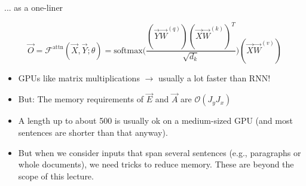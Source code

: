 
\begin{vbframe}{... as a one-liner}

\vfill

\large
$$ \vec O = \mathcal{F}^\mathrm{attn}(\vec X, \vec Y; \theta) = \mathrm{softmax}\Big(\frac{(\vec Y\vec W^{(q)} ) (\vec X\vec W^{(k)} )^T}{\sqrt{d_k}}\Big)(\vec X\vec W^{(v)} ) $$
\begin{itemize}
	\item GPUs like matrix multiplications $\rightarrow$ usually a lot faster than RNN!
	\item But: The memory requirements of $\vec E$ and $\vec A$ are $\mathcal{O}(J_y J_x)$
	\item A length up to about 500 is usually ok on a medium-sized GPU (and most sentences are shorter than that anyway).
	\item But when we consider inputs that span several sentences (e.g., paragraphs or whole documents), we need tricks to reduce memory. These are beyond the scope of this lecture.
\end{itemize}

\vfill

\end{vbframe}


\endlecture

